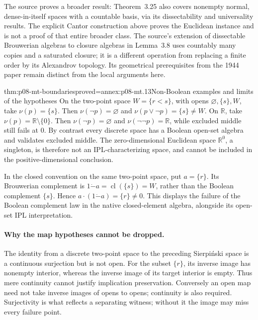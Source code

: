 The source proves a broader result: Theorem~3.25 also covers nonempty normal,
dense-in-itself spaces with a countable basis, via its dissectability
and universality results. The explicit Cantor construction above proves
the Euclidean instance and is not a proof of that entire broader class.
The source's extension of dissectable Brouwerian algebras to closure
algebras in Lemma~3.8 uses countably many copies and a saturated closure;
it is a different operation from replacing a finite order by its
Alexandrov topology. Its geometrical prerequisites from the 1944 paper
remain distinct from the local arguments here.

\begin{hblemma}{thm:p08-mt-boundaries}{proved=annex:p08-mt.13}{Non-Boolean examples and limits of the hypotheses}
On the two-point space \(W=\{r<s\}\), with opens
\(\varnothing,\{s\},W\), take \(\nu(p)=\{s\}\). Then
\(\nu(\neg p)=\varnothing\) and
\(\nu(p\vee\neg p)=\{s\}\ne W\).
On \(\mathbb R\), take \(\nu(p)=\mathbb R\setminus\{0\}\).
Then \(\nu(\neg p)=\varnothing\) and
\(\nu(\neg\neg p)=\mathbb R\), while excluded middle still fails at
\(0\). By contrast every discrete space has a Boolean open-set algebra
and validates excluded middle. The zero-dimensional Euclidean space
\(\mathbb R^0\), a singleton, is therefore not an IPL-characterizing
space, and cannot be included in the positive-dimensional conclusion.
\end{hblemma}

In the closed convention on the same two-point space, put \(a=\{r\}\).
Its Brouwerian complement is \(1\mathbin{\dot{-}}a
=\operatorname{cl}(\{s\})=W\), rather than the Boolean complement
\(\{s\}\). Hence \(a\cdot(1\mathbin{\dot{-}}a)=\{r\}\ne0\).
This displays the failure of the Boolean complement law in the native
closed-element algebra, alongside its open-set IPL interpretation.

\paragraph{Why the map hypotheses cannot be dropped.}
The identity from a discrete two-point space to the preceding
Sierpi\'nski space is a continuous surjection but is not open.
For the subset \(\{r\}\), its inverse image has nonempty interior,
whereas the inverse image of its target interior is empty. Thus mere
continuity cannot justify implication preservation. Conversely an
open map need not take inverse images of opens to opens; continuity
is also required. Surjectivity is what reflects a separating witness;
without it the image may miss every failure point.
